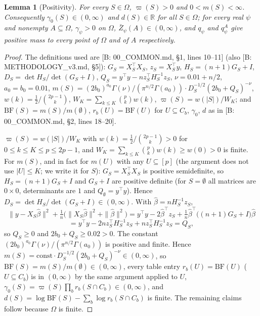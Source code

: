 \documentclass[11pt]{article}
\newtheorem{lemma}{Lemma}
\theoremstyle{remark}
\newcommand{\Zb}{\bar Z}
\begin{document}
\begin{lemma}[Positivity]\label{lem:pos}
For every $S\in\Omega$, $\varpi(S)>0$ and $0<m(S)<\infty$. Consequently $\gamma_0(S)\in(0,\infty)$ and $d(S)\in\mathbb{R}$ for all $S\in\Omega$; for every real $\psi$ and nonempty $A\subseteq\Omega$, $\gamma_\psi>0$ on $\Omega$, $\Zb_\psi(A)\in(0,\infty)$, and $q_\psi$ and $q_\psi^A$ give positive mass to every point of $\Omega$ and of $A$ respectively.
\end{lemma}
\begin{proof}
The definitions used are [B: 00\_COMMON.md, \S1, lines 10--11] (also [B: METHODOLOGY\_v3.md, \S5]): $G_S=X_S^\top X_S$, $z_S=X_S^\top y$, $H_S=(n+1)G_S+I$, $D_S=\det H_S/\det(G_S+I)$, $Q_S=y^\top y-nz_S^\top H_S^{-1}z_S$, $\nu=0.01+n/2$, $a_0=b_0=0.01$,
$m(S)=(2b_0)^{a_0}\Gamma(\nu)/(\pi^{n/2}\Gamma(a_0))\cdot D_S^{-1/2}(2b_0+Q_S)^{-\nu}$, $w(k)=\tfrac12/\binom{2p-1}{k}$, $W_K=\sum_{k\le K}\binom pk w(k)$, $\varpi(S)=w(|S|)/W_K$; and $\mathrm{BF}(S)=m(S)/m(\emptyset)$, $r_b(U)=\mathrm{BF}(U)$ for $U\subseteq C_b$, $\gamma_0$, $d$ as in [B: 00\_COMMON.md, \S2, lines 18--20].

$\varpi(S)=w(|S|)/W_K$ with $w(k)=\tfrac12/\binom{2p-1}{k}>0$ for $0\le k\le K\le p\le 2p-1$, and $W_K=\sum_{k\le K}\binom pk w(k)\ge w(0)>0$ is finite.
For $m(S)$, and in fact for $m(U)$ with any $U\subseteq[p]$ (the argument does not use $|U|\le K$; we write it for $S$): $G_S=X_S^\top X_S$ is positive semidefinite, so $H_S=(n+1)G_S+I$ and $G_S+I$ are positive definite (for $S=\emptyset$ all matrices are $0\times 0$, determinants are $1$ and $Q_\emptyset=y^\top y$). Hence $D_S=\det H_S/\det(G_S+I)\in(0,\infty)$. With $\hat\beta=nH_S^{-1}z_S$,
\[
\|y-X_S\hat\beta\|^2+\tfrac1n\bigl(\|X_S\hat\beta\|^2+\|\hat\beta\|^2\bigr)
= y^\top y-2\hat\beta^\top z_S+\tfrac1n\hat\beta^\top\bigl((n+1)G_S+I\bigr)\hat\beta
\]\[
= y^\top y-2n z_S^\top H_S^{-1}z_S+n z_S^\top H_S^{-1}z_S=Q_S,
\]
so $Q_S\ge0$ and $2b_0+Q_S\ge 0.02>0$. The constant $(2b_0)^{a_0}\Gamma(\nu)/(\pi^{n/2}\Gamma(a_0))$ is positive and finite. Hence $m(S)=\text{const}\cdot D_S^{-1/2}(2b_0+Q_S)^{-\nu}\in(0,\infty)$, so $\mathrm{BF}(S)=m(S)/m(\emptyset)\in(0,\infty)$, every table entry $r_b(U)=\mathrm{BF}(U)$ ($U\subseteq C_b$) is in $(0,\infty)$ by the same argument applied to $U$, $\gamma_0(S)=\varpi(S)\prod_b r_b(S\cap C_b)\in(0,\infty)$, and $d(S)=\log\mathrm{BF}(S)-\sum_b\log r_b(S\cap C_b)$ is finite. The remaining claims follow because $\Omega$ is finite.
\end{proof}
\end{document}
